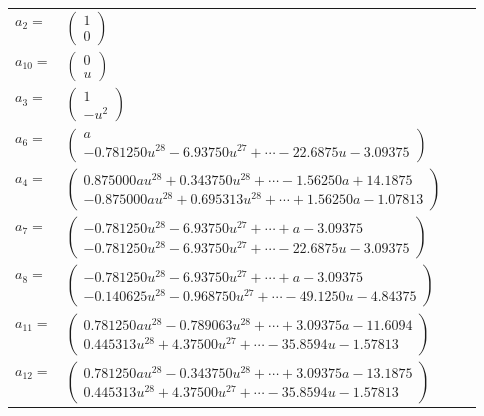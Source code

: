 \documentclass[1p]{elsarticle_modified}
\theoremstyle{definition}
\begin{document}
\begin{tabular}{m{7pt} m{180pt} m{7pt} m{180pt} }
\flushright $a_{2}=$&$\begin{pmatrix}1\\0\end{pmatrix}$ \\
\flushright $a_{10}=$&$\begin{pmatrix}0\\u\end{pmatrix}$ \\
\flushright $a_{3}=$&$\begin{pmatrix}1\\- u^2\end{pmatrix}$ \\
\flushright $a_{6}=$&$\begin{pmatrix}a\\-0.781250 u^{28}-6.93750 u^{27}+\cdots-22.6875 u-3.09375\end{pmatrix}$ \\
\flushright $a_{4}=$&$\begin{pmatrix}0.875000 a u^{28}+0.343750 u^{28}+\cdots-1.56250 a+14.1875\\-0.875000 a u^{28}+0.695313 u^{28}+\cdots+1.56250 a-1.07813\end{pmatrix}$ \\
\flushright $a_{7}=$&$\begin{pmatrix}-0.781250 u^{28}-6.93750 u^{27}+\cdots+a-3.09375\\-0.781250 u^{28}-6.93750 u^{27}+\cdots-22.6875 u-3.09375\end{pmatrix}$ \\
\flushright $a_{8}=$&$\begin{pmatrix}-0.781250 u^{28}-6.93750 u^{27}+\cdots+a-3.09375\\-0.140625 u^{28}-0.968750 u^{27}+\cdots-49.1250 u-4.84375\end{pmatrix}$ \\
\flushright $a_{11}=$&$\begin{pmatrix}0.781250 a u^{28}-0.789063 u^{28}+\cdots+3.09375 a-11.6094\\0.445313 u^{28}+4.37500 u^{27}+\cdots-35.8594 u-1.57813\end{pmatrix}$ \\
\flushright $a_{12}=$&$\begin{pmatrix}0.781250 a u^{28}-0.343750 u^{28}+\cdots+3.09375 a-13.1875\\0.445313 u^{28}+4.37500 u^{27}+\cdots-35.8594 u-1.57813\end{pmatrix}$ \\

\end{tabular}
\end{document}
